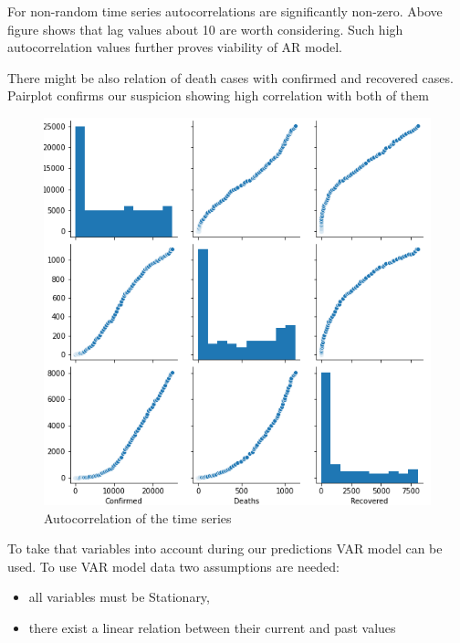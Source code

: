 \documentclass[conference]{IEEEtran}
\begin{document}
For non-random time series autocorrelations are significantly non-zero. Above figure shows that lag values about 10 are worth considering. 
 Such high autocorrelation values further proves viability of AR model.

There might be also relation of death cases with confirmed and recovered cases. Pairplot confirms our suspicion showing high correlation with both of them

\begin{figure}[h!]
    \includegraphics[width=\linewidth]{images/Correlation.png}
    \caption{Autocorrelation of the time series}
    \label{fig:AutoCorrelation}
\end{figure}

To take that variables into account during our predictions VAR model can be used.
 To use VAR model data two assumptions are needed:
 \begin{itemize}
\item all variables must be Stationary,
\item there exist a linear relation between their current and past values
\end{itemize}
\end{document}
